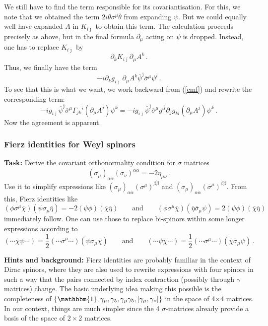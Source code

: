 \documentclass[12pt]{article}
\newcommand{\be}{\begin{equation}}
\newcommand{\ee}{\end{equation}}
\newcommand{\ol}{\overline}
\numberwithin{equation}{section}
\begin{document}
We still have to find the term responsible for its covariantisation. For this, we note that we obtained the term $2i\theta\sigma^\mu\ol{\theta}$ from expanding $\psi$. But we could equally well have expanded $A$ in $K_{i\ol{\jmath}}$ to obtain this term. The calculation proceeds precisely as above, but in the final formula $\partial_\mu$ acting on $\psi$ is dropped. Instead, one has to replace $K_{i\ol{\jmath}}$ by
\be
\partial_k K_{i\ol{\jmath}} \partial_\mu A^k\,.
\ee
Thus, we finally have the term
\be
-i\partial_k g_{i\ol{\jmath}}\,\partial_\mu A^k \ol{\psi}^{\ol{\jmath}}\ol{\sigma}^\mu \psi^i\,.
\ee
To see that this is what we want, we work backward from (\ref{cmf}) and rewrite the corresponding term:
\be
-ig_{i\ol{\jmath}}\ol{\psi}^{\ol{\jmath}}\ol{\sigma}^\mu \Gamma_{jk}{}^i (\partial_\mu A^j)\psi^k=
-ig_{i\ol{\jmath}}\ol{\psi}^{\ol{\jmath}}\ol{\sigma}^\mu g^{i\ol{l}}\partial_j g_{k\ol{l}} (\partial_\mu A^j)\psi^k
\,.
\ee
Now the agreement is apparent.







\subsubsection{Fierz identities for Weyl spinors}

{\bf Task:} Derive the covariant orthonormality condition for $\sigma$ matrices
\be
(\sigma_\mu)_{\alpha\dot{\alpha}}(\ol{\sigma}_\nu)^{\dot{\alpha}\alpha}=-2\eta_{\mu\nu}\,.
\label{sse}
\ee
Use it to simplify expressions like $(\sigma_\mu)_{\alpha\dot{\alpha}}(\sigma^\mu)^{\beta\dot{\beta}}$ and $(\sigma_\mu)_{\alpha\dot{\alpha}}(\ol{\sigma}^\mu)^{\dot{\beta}\beta}$. From this, Fierz identities like
\be
(\phi\sigma^\mu\ol{\chi})(\psi\sigma_\mu\ol{\eta})=-2(\psi\phi)(\ol{\chi}\ol{\eta})
\qquad\mbox{and}\qquad
(\phi\sigma^\mu\ol{\chi})(\ol{\eta}\ol{\sigma}_\mu\psi)=2(\psi\phi)(\ol{\chi}\ol{\eta})\label{2fi}
\ee
immediately follow. One can use those to replace bi-spinors within some longer expressions according to
\be
(\cdots\ol{\chi}\psi\cdots)=\frac{1}{2}(\cdots \ol{\sigma}^\mu\cdots)(\psi\sigma_\mu\ol{\chi})
\qquad\mbox{and}\qquad
(\cdots\psi\ol{\chi}\cdots)=\frac{1}{2}(\cdots \sigma^\mu\cdots)(\ol{\chi}\ol{\sigma}_\mu\psi)\,.\label{fiis}
\ee

\noindent
{\bf Hints and background:} Fierz identities are probably familiar in the context of Dirac spinors, where they are also used to rewrite expressions with four spinors in such a way that the pairs connected by index contraction (possibly through $\gamma$ matrices) change. The basic underlying idea making this possible is the completeness of $\{\mathbbm{1},\gamma_\mu,\gamma_5,\gamma_\mu\gamma_5,[\gamma_\mu,\gamma_\nu]\}$ in the space of 4$\times 4$ matrices. In our context, things are much simpler since the 4 $\sigma$-matrices already provide a basis of the space of $2\times 2$ matrices.
\end{document}
